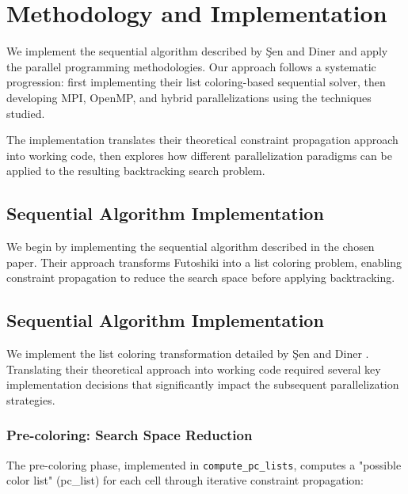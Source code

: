 \section{Methodology and Implementation}
\label{sec:solution}

We implement the sequential algorithm described by Şen and Diner \cite{Sen2024Futoshiki} and apply the parallel programming methodologies. Our approach follows a systematic progression: first implementing their list coloring-based sequential solver, then developing MPI, OpenMP, and hybrid parallelizations using the techniques studied.

The implementation translates their theoretical constraint propagation approach into working code, then explores how different parallelization paradigms can be applied to the resulting backtracking search problem.

\subsection{Sequential Algorithm Implementation}
\label{subsec:paper_implementation}
We begin by implementing the sequential algorithm described in the chosen paper. Their approach transforms Futoshiki into a list coloring problem, enabling constraint propagation to reduce the search space before applying backtracking.

\subsection{Sequential Algorithm Implementation}
\label{subsec:paper_implementation}
We implement the list coloring transformation detailed by Şen and Diner \cite{Sen2024Futoshiki}. Translating their theoretical approach into working code required several key implementation decisions that significantly impact the subsequent parallelization strategies.

\subsubsection{Pre-coloring: Search Space Reduction}
\label{subsubsec:precoloring}
The pre-coloring phase, implemented in \texttt{compute\_pc\_lists}, computes a "possible color list" (pc\_list) for each cell through iterative constraint propagation:

